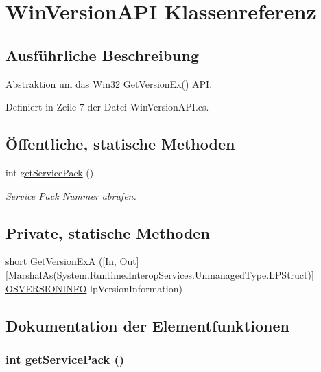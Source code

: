 \hypertarget{classQbeSAS_1_1WinVersionAPI}{
\section{Win\-Version\-API Klassenreferenz}
\label{classQbeSAS_1_1WinVersionAPI}
}


\subsection{Ausf\"{u}hrliche Beschreibung}
Abstraktion um das Win32 Get\-Version\-Ex() API. 



Definiert in Zeile 7 der Datei Win\-Version\-API.cs.\subsection*{\"{O}ffentliche, statische Methoden}
\begin{CompactItemize}
\item 
int \hyperlink{classQbeSAS_1_1WinVersionAPI_QbeSAS_1_1WinVersionAPIe0}{get\-Service\-Pack} ()
\begin{CompactList}\small\item\em Service Pack Nummer abrufen. \item\end{CompactList}\end{CompactItemize}
\subsection*{Private, statische Methoden}
\begin{CompactItemize}
\item 
short \hyperlink{classQbeSAS_1_1WinVersionAPI_QbeSAS_1_1WinVersionAPIh0}{Get\-Version\-Ex\-A} (\mbox{[}In, Out\mbox{]}\mbox{[}Marshal\-As(System.Runtime.Interop\-Services.Unmanaged\-Type.LPStruct)\mbox{]} \hyperlink{classQbeSAS_1_1WinVersionAPI_1_1OSVERSIONINFO}{OSVERSIONINFO} lp\-Version\-Information)
\end{CompactItemize}


\subsection{Dokumentation der Elementfunktionen}
\hypertarget{classQbeSAS_1_1WinVersionAPI_QbeSAS_1_1WinVersionAPIe0}{
\subsubsection[getServicePack]{\setlength{\rightskip}{0pt plus 5cm}int get\-Service\-Pack ()}}
\label{classQbeSAS_1_1WinVersionAPI_QbeSAS_1_1WinVersionAPIe0}


